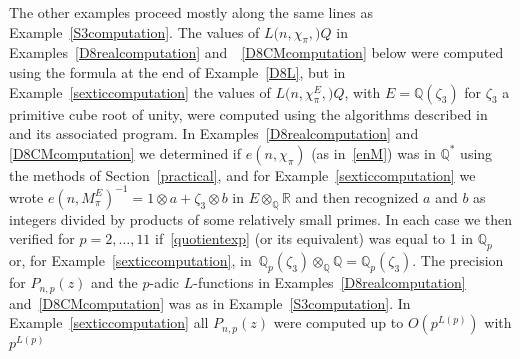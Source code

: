 \documentclass{amsart}
\begin{document}
The other examples proceed mostly along the same lines as Example~\ref{S3computation}.
The values of $ {L(n,{\chi_\pi},{\mathbb)}Q} $ in Examples~\ref{D8realcomputation} and~~\ref{D8CMcomputation} below
were computed using the formula at the end of Example~\ref{D8L}, but in Example~\ref{sexticcomputation}
the values of $ {L(n,\chi_\pi^E,{\mathbb)}Q} $, with  $ E = {\mathbb Q}({\zeta}_3) $ for $ {\zeta}_3 $ a primitive cube root of unity,
were computed using the algorithms described in \cite{Dok1} and its associated program.
In Examples~\ref{D8realcomputation} and \ref{D8CMcomputation} we determined
if $ e(n,\chi_\pi) $ (as in~\eqref{enM}) was in $ {\mathbb Q}^* $ using the methods of Section~\ref{practical}, and
for Example~\ref{sexticcomputation} we wrote $ e(n,M_\pi^E)^{-1} = 1 {\otimes} a + {\zeta}_3 {\otimes} b $ in
$ E {\otimes}_{\mathbb Q} {\mathbb R} $ and then recognized $ a $ and $ b $ as integers divided by products of some relatively small primes.
In each case we then verified for $ p=2,\dots,11 $ if~\eqref{quotientexp} 
(or its equivalent) was equal to 1 in $ {{\mathbb Q_p}} $ or, for Example~\ref{sexticcomputation},
in~$ {{\mathbb Q_p}}({\zeta}_3){\otimes}_{\mathbb Q}{\mathbb Q} = {{\mathbb Q_p}}({\zeta}_3) $.  The precision for $ {P_{n,p}}(z) $ and the {$p$-adic{\futurelet{}}} {$L$-functions{\futurelet{}}}
in Examples~\ref{D8realcomputation} and~\ref{D8CMcomputation} was as in Example~\ref{S3computation}.
In Example~\ref{sexticcomputation} all $ {P_{n,p}}(z) $ were computed up to $ O(p^{L(p)}) $ with $ p^{L(p)} $
\end{document}
